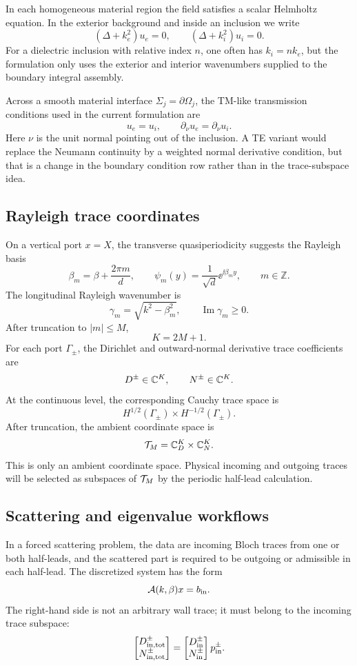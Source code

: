 In each homogeneous material region the field satisfies a scalar Helmholtz
equation.  In the exterior background and inside an inclusion we write
\[
  (\Delta+k_e^2)u_e=0,
  \qquad
  (\Delta+k_i^2)u_i=0 .
\]
For a dielectric inclusion with relative index \(n\), one often has
\(k_i=nk_e\), but the formulation only uses the exterior and interior
wavenumbers supplied to the boundary integral assembly.

Across a smooth material interface \(\Sigma_j=\partial\Omega_j\), the TM-like
transmission conditions used in the current formulation are
\[
  u_e=u_i,
  \qquad
  \partial_\nu u_e=\partial_\nu u_i .
\]
Here \(\nu\) is the unit normal pointing out of the inclusion.  A TE variant
would replace the Neumann continuity by a weighted normal derivative condition,
but that is a change in the boundary condition row rather than in the
trace-subspace idea.

\subsection{Rayleigh trace coordinates}

On a vertical port \(x=X\), the transverse quasiperiodicity suggests the
Rayleigh basis
\[
  \beta_m=\beta+\frac{2\pi m}{d},
  \qquad
  \psi_m(y)=\frac{1}{\sqrt d}\ee^{\ii\beta_m y},
  \qquad
  m\in\mathbb Z .
\]
The longitudinal Rayleigh wavenumber is
\[
  \gamma_m=\sqrt{k^2-\beta_m^2},
  \qquad
  \operatorname{Im}\gamma_m\ge 0 .
\]
After truncation to \(|m|\le M\),
\[
  K=2M+1 .
\]
For each port \(\Gamma_\pm\), the Dirichlet and outward-normal derivative trace
coefficients are
\[
  D^\pm\in\mathbb C^K,
  \qquad
  N^\pm\in\mathbb C^K .
\]
At the continuous level, the corresponding Cauchy trace space is
\[
  H^{1/2}(\Gamma_\pm)\times H^{-1/2}(\Gamma_\pm).
\]
After truncation, the ambient coordinate space is
\[
  \mathcal T_M=\mathbb C_D^K\times\mathbb C_N^K .
\]
This is only an ambient coordinate space.  Physical incoming and outgoing traces
will be selected as subspaces of \(\mathcal T_M\) by the periodic half-lead
calculation.

\subsection{Scattering and eigenvalue workflows}

In a forced scattering problem, the data are incoming Bloch traces from one or
both half-leads, and the scattered part is required to be outgoing or admissible
in each half-lead.  The discretized system has the form
\[
  \mathcal A(k,\beta)x=b_{\mathrm{in}} .
\]
The right-hand side is not an arbitrary wall trace; it must belong to the
incoming trace subspace:
\[
  \begin{bmatrix}
  D_{\mathrm{in,tot}}^\pm\\
  N_{\mathrm{in,tot}}^\pm
  \end{bmatrix}
  =
  \begin{bmatrix}
  D_{\mathrm{in}}^\pm\\
  N_{\mathrm{in}}^\pm
  \end{bmatrix}p_{\mathrm{in}}^\pm .
\]

